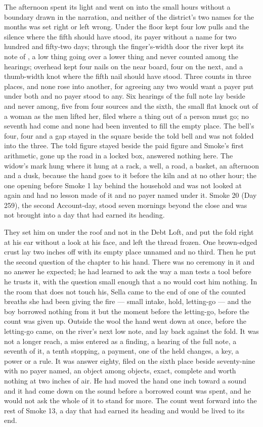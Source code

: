 The afternoon spent its light and went on into the small hours without a boundary drawn in the narration, and neither of the district's two names for the months was set right or left wrong. Under the floor  kept four low pulls and the silence where the fifth should have stood, its payer without a name for two hundred and fifty-two days; through the finger's-width door the river kept its note of , a low thing going over a lower thing and never counted among the hearings; overhead  kept four nails on the near board, four on the next, and a thumb-width knot where the fifth nail should have stood. Three counts in three places, and none rose into another, for agreeing any two would want a payer put under both and no payer stood to any. Six hearings of the full note lay beside and never among, five from four sources and the sixth, the small flat knock out of a woman as the men lifted her, filed where a thing out of a person must go; no seventh had come and none had been invented to fill the empty place. The bell's four, four and a gap stayed in the square beside the told bell and was not folded into the three. The told figure stayed beside the paid figure and Smoke's first arithmetic, gone up the road in a locked box, answered nothing here. The widow's mark hung where it hung at a rack, a well, a road, a basket, an afternoon and a dusk, because the hand goes to it before the kiln and at no other hour; the one opening before Smoke 1 lay behind the household and was not looked at again and had no lesson made of it and no payer named under it. Smoke 20 (Day 259), the second Account-day, stood seven mornings beyond the close and was not brought into a day that had earned its heading.

They set him on  under the roof and not in the Debt Loft, and put the fold right at his ear without a look at his face, and left the thread frozen. One brown-edged crust lay two inches off with its empty place unnamed and no third. Then he put the second question of the chapter to his hand. There was no ceremony in it and no answer he expected; he had learned to ask the way a man tests a tool before he trusts it, with the question small enough that a no would cost him nothing. In the room that does not touch his, Sella came to the end of one of the counted breaths she had been giving the fire — small intake, hold, letting-go — and the boy borrowed nothing from it but the moment before the letting-go, before the count was given up. Outside the wool the hand went down at once, before the letting-go came, on the river's next low note, and lay back against the fold. It was not a longer reach, a miss entered as a finding, a hearing of the full note, a seventh of it, a tenth stopping, a payment, one of the held changes, a key, a power or a rule. It was answer eighty, filed on the sixth place beside seventy-nine with no payer named, an object among objects, exact, complete and worth nothing at two inches of air. He had moved the hand one inch toward a sound and it had come down on the sound before a borrowed count was spent, and he would not ask the whole of it to stand for more. The count went forward into the rest of Smoke 13, a day that had earned its heading and would be lived to its end.
